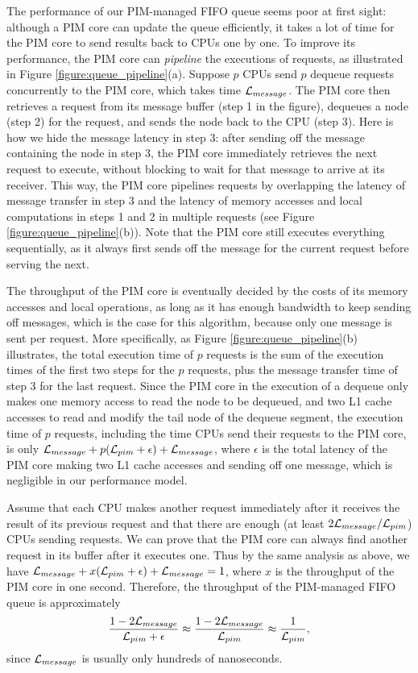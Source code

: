 The performance of our PIM-managed FIFO queue seems poor at first sight: although a PIM core can update 
the queue efficiently, it takes a lot of time for the PIM core to send results back to CPUs one by one. 
To improve its performance, the PIM core can \textit{pipeline} the executions of requests, 
as illustrated in Figure \ref{figure:queue_pipeline}(a). 
Suppose $p$ CPUs send $p$ dequeue requests concurrently to the PIM core, which takes time $\mathcal{L}_{message}$. 
The PIM core then retrieves a request from its message buffer (step 1 in the figure), 
dequeues a node (step 2) for the request, and sends the node back to the CPU (step 3). 
Here is how we hide the message latency in step 3: 
after sending off the message containing the node in step 3, the PIM core immediately retrieves the next 
request to execute, without blocking to wait for that message to arrive at its receiver. 
This way, the PIM core pipelines requests by overlapping the latency of message transfer in step 3  
and the latency of memory accesses and local computations in steps 1 and 2 in multiple requests 
(see Figure \ref{figure:queue_pipeline}(b)). 
Note that the PIM core still executes everything sequentially, 
as it always first sends off the message for the current request before serving the next.
 
The throughput of the PIM core is eventually decided by the costs of its memory accesses and local operations, 
as long as it has enough bandwidth to keep sending off messages,  
which is the case for this algorithm, because only one message is sent per request.
More specifically, as Figure \ref{figure:queue_pipeline}(b) illustrates, 
the total execution time of $p$ requests is the sum of the execution times of the first two steps 
for the $p$ requests, plus the message transfer time of step 3 for the last request.   
Since the PIM core in the execution of a dequeue only makes one memory access to read the node 
to be dequeued, and two L1 cache accesses to read and modify the tail node of the dequeue segment,   
the execution time of $p$ requests, including the time CPUs send their requests to the PIM core, 
is only $\mathcal{L}_{message} + p(\mathcal{L}_{pim} + \epsilon) + \mathcal{L}_{message}$, where $\epsilon$ 
is the total latency of the PIM core making two L1 cache accesses and sending off one message, 
which is negligible in our performance model. 

Assume that each CPU makes another request immediately after it receives the result of its previous request 
and that there are enough (at least $2\mathcal{L}_{message} / \mathcal{L}_{pim}$) CPUs sending requests.
We can prove that the PIM core can always find another request in its buffer after it executes one. 
Thus by the same analysis as above, we have $\mathcal{L}_{message} + x(\mathcal{L}_{pim} + \epsilon) + \mathcal{L}_{message} = 1$, 
where $x$ is the throughput of the PIM core in one second. 
Therefore, the throughput of the PIM-managed FIFO queue is approximately 
$${1 - 2\mathcal{L}_{message} \over \mathcal{L}_{pim} + \epsilon} \approx {1 - 2\mathcal{L}_{message}\over \mathcal{L}_{pim}} 
\approx {1 \over \mathcal{L}_{pim}},$$
since $\mathcal{L}_{message}$ is usually only hundreds of nanoseconds. 

